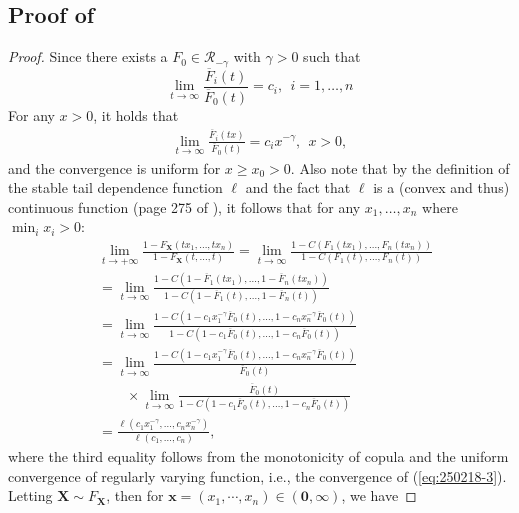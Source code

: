 \documentclass[12pt]{article}
\theoremstyle{plain}
\theoremstyle{plain}
\theoremstyle{definition}
\begin{document}
\subsection{Proof of }
\label{subsec:proof-copula-to-mrv-distribution}

 \CopulaToMRV*

\begin{proof}
Since there exists a $F_0\in\mathscr{R}_{-\gamma}$ with $\gamma>0$ such that
\[
\lim_{t\to\infty} \frac{\overline{F}_i(t)}{\overline{F}_0(t) }  = c_i,~~i=1,\dots,n
\]
For any $x>0$, it holds that
\begin{align}
     \lim_{t\to\infty} \frac{\overline{F}_i(tx)}{\overline{F}_0(t) }  = c_ix^{-\gamma},~~x>0, \label{eq:250218-3}
\end{align}
and the convergence is uniform for $x\ge x_0>0$.
Also note that by the definition of the stable tail dependence function $\ell$ and the fact that $\ell$ is a (convex and thus) continuous function (page 275 of ), 
it follows that  for any $x_1,\dots,x_n$ where $\min_i x_i > 0$:
\begin{equation}\label{eq:tail_ratio}
    \begin{aligned}
&\lim_{t\to+\infty}\frac{1-F_{\mathbf{X}}(tx_1,\dots,tx_n)}{1-F_{\mathbf{X}}(t,\dots,t)} 
=  \lim_{t\to\infty}\frac{1-C(F_1(tx_1),\dots,F_n(tx_n))}{1-C(F_1(t),\dots,F_n(t))}\\
&= \lim_{t\to\infty}\frac{1-C(1-\overline{F}_1(tx_1),\dots,1-\overline{F}_n(tx_n))}{1-C(1-\overline{F}_1(t),\dots,1-\overline{F}_n(t))}\\
&= \lim_{t\to\infty}\frac{1-C(1-c_1x_1^{-\gamma}\overline{F}_0(t),\dots,1-c_nx_n^{-\gamma}\overline{F}_0(t))}{1-C(1-c_1\overline{F}_0(t),\dots,1-c_n\overline{F}_0(t))}\\ 
&= \lim_{t\to\infty}\frac{1-C(1-c_1x_1^{-\gamma}\overline{F}_0(t),\dots,1-c_nx_n^{-\gamma}\overline{F}_0(t))}{ \overline{F}_0(t)}\\
&\qquad\times\lim_{t\to\infty}\frac{ \overline{F}_0(t)} {1-C(1-c_1\overline{F}_0(t),\dots,1-c_n\overline{F}_0(t))}\\[3pt]
& = \frac{\ell(c_1x_1^{-\gamma},\dots,c_nx_n ^{-\gamma})} {\ell(c_1,\dots,c_n)},
\end{aligned}
\end{equation}
 where the third equality follows from the monotonicity of copula and the uniform convergence of regularly varying  function, i.e., the convergence of (\ref{eq:250218-3}). 
 Letting $\mathbf{X}\sim F_{\mathbf{X}}$, then for $\mathbf{x}=(x_1,\cdots, x_n)\in (\mathbf{0}, \bm{\infty}) $, we have

\end{proof}
\end{document}
